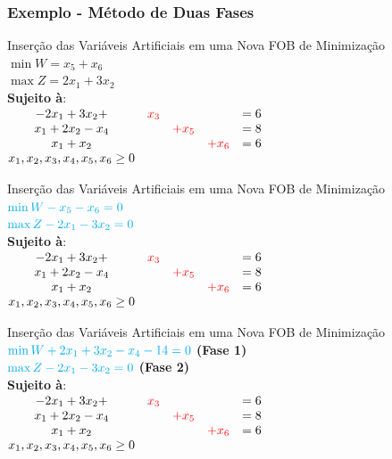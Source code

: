\documentclass{beamer}
\begin{document}
\begin{frame}
	\frametitle{Exemplo - Método de Duas Fases}
	{
		\begin{alertblock}{\centering Inserção das Variáveis Artificiais em uma Nova FOB de Minimização}
			$ \min W = x_5 + x_6 $ \\
			$ \max Z = 2 x_1 + 3 x_2  $ \\
			{\textbf{Sujeito à}}: \\
			$
				\begin{matrix}
					-2x_1+3x_2+   & {\color{red}x_3} &                  &  					& = 6 \\
					x_1+2x_2-x_4  &				     & \color{red}+x_5  &  					& = 8 \\
					x_1+x_2		  &			         &				   & \color{red}+x_6 	& = 6 \\
					x_1, x_2, x_3,x_4,x_5,x_6 \ge 0  \\
				\end{matrix}
			$
		\end{alertblock}	
	}
	{
		\begin{alertblock}{\centering Inserção das Variáveis Artificiais em uma Nova FOB de Minimização}
			$ \color{cyan} \min W -x_5 - x_6 = 0 $\\
			$ \color{cyan} \max Z -2x_1 -3x_2 = 0 $ \\
			{\textbf{Sujeito à}}: \\
			$
				\begin{matrix}
					-2x_1+3x_2+   & {\color{red}x_3} &                  &  					& = 6 \\
					x_1+2x_2-x_4  &				     & \color{red}+x_5  &  					& = 8 \\
					x_1+x_2		  &			         &				   & \color{red}+x_6 	& = 6 \\
					x_1, x_2, x_3,x_4,x_5,x_6 \ge 0  \\
				\end{matrix}
			$
		\end{alertblock}	
	}
	{
		\begin{alertblock}{\centering Inserção das Variáveis Artificiais em uma Nova FOB de Minimização}
			$ \color{cyan} \min W +2x_1 +3x_2-x_4-14=0 $ {\color{olive} \textbf{(Fase 1)}} \\
			$ \color{cyan} \max Z -2x_1 -3x_2 = 0 $ {\color{olive} \textbf{(Fase 2)}} \\
			{\textbf{Sujeito à}}: \\
			$
				\begin{matrix}
					-2x_1+3x_2+   & {\color{red}x_3} &                  &  					& = 6 \\
					x_1+2x_2-x_4  &				     & \color{red}+x_5  &  					& = 8 \\
					x_1+x_2		  &			         &				   & \color{red}+x_6 	& = 6 \\
					x_1, x_2, x_3,x_4,x_5,x_6 \ge 0  \\
				\end{matrix}
			$
		\end{alertblock}	
	}
\end{frame}
\end{document}
